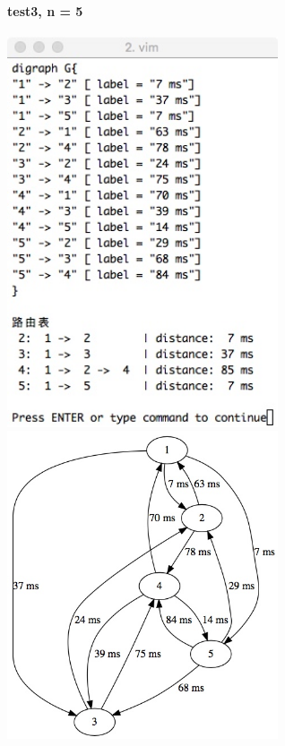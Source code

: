 \documentclass{article}
\begin{document}
		\paragraph{test3, n = 5}
			\begin{center}
			\includegraphics[width = 8cm]{data51.jpeg}
			\includegraphics[width = 8cm]{data51viz.jpeg}
			\end{center}
\end{document}
